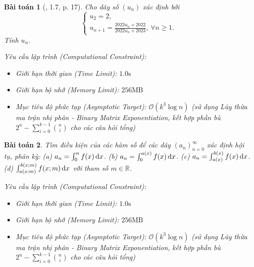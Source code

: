 \documentclass{article}
\newtheorem{baitoan}{Bài toán}
\begin{document}
\begin{baitoan}[\cite{Quoc_Long_Dat_Nam_VMC}, 1.7, p. 17]
	Cho dãy số $(u_n)$ xác định bởi
	\begin{equation*}
		\begin{cases}
			u_2 = 2,\\
			u_{n+1} = \frac{2023u_n + 2022}{2022u_n + 2023},\ \forall n\ge1.
		\end{cases}
	\end{equation*}
	Tính $u_n$.

    \vspace{0.5em}
    \emph{Yêu cầu lập trình (Computational Constraint):}
    \begin{itemize}
        \item Giới hạn thời gian (Time Limit): $1.0\mathrm{s}$
        \item Giới hạn bộ nhớ (Memory Limit): $256\mathrm{MB}$
        \item Mục tiêu độ phức tạp (Asymptotic Target): $\mathcal{O}(k^3 \log n)$ (sử dụng Lũy thừa ma trận nhị phân - Binary Matrix Exponentiation, kết hợp phần bù $2^n - \sum_{i=0}^{k-1} \binom{n}{i}$ cho các câu hỏi tổng)
    \end{itemize}
\end{baitoan}


\begin{baitoan}
	Tìm điều kiện của các hàm số để các dãy $(a_n)_{n=0}^\infty$ xác định hội tụ, phân kỳ: (a) $a_n = \int_0^n f(x)\,{\rm d}x$. (b) $a_n = \int_0^{a(x)} f(x)\,{\rm d}x$. (c) $a_n = \int_{a(x)}^{b(x)} f(x)\,{\rm d}x$. (d) $\int_{a(x;m)}^{b(x;m)} f(x;m)\,{\rm d}x$ với tham số $m\in\mathbb{R}$.

    \vspace{0.5em}
    \emph{Yêu cầu lập trình (Computational Constraint):}
    \begin{itemize}
        \item Giới hạn thời gian (Time Limit): $1.0\mathrm{s}$
        \item Giới hạn bộ nhớ (Memory Limit): $256\mathrm{MB}$
        \item Mục tiêu độ phức tạp (Asymptotic Target): $\mathcal{O}(k^3 \log n)$ (sử dụng Lũy thừa ma trận nhị phân - Binary Matrix Exponentiation, kết hợp phần bù $2^n - \sum_{i=0}^{k-1} \binom{n}{i}$ cho các câu hỏi tổng)
    \end{itemize}
\end{baitoan}
\end{document}
